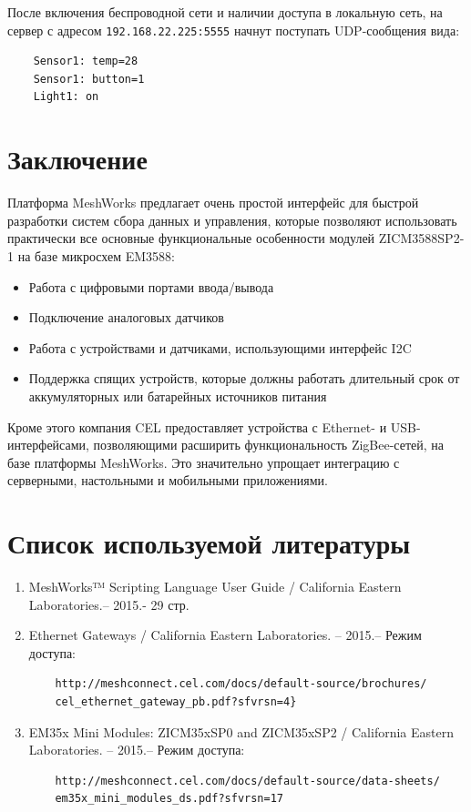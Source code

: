 \documentclass[11pt]{article}
\begin{document}
После включения беспроводной сети и наличии доступа в локальную сеть, на сервер с адресом
\texttt{192.168.22.225:5555} начнут поступать UDP-сообщения вида:
\begin{verbatim}
    Sensor1: temp=28
    Sensor1: button=1
    Light1: on
\end{verbatim}

\section*{Заключение}
Платформа MeshWorks предлагает очень простой интерфейс для быстрой разработки систем
сбора данных и управления, которые позволяют использовать практически все основные функциональные
особенности модулей ZICM3588SP2-1 на базе микросхем EM3588:
\begin{itemize}
 \item Работа с цифровыми портами ввода/вывода
 \item Подключение аналоговых датчиков
 \item Работа с устройствами и датчиками, использующими интерфейс I2C
 \item Поддержка спящих устройств, которые должны работать длительный срок от
 аккумуляторных или батарейных источников питания
\end{itemize}
Кроме этого компания CEL предоставляет устройства с Ethernet- и USB-интерфейсами, 
позволяющими расширить функциональность ZigBee-сетей, на базе платформы MeshWorks.
Это значительно упрощает интеграцию с серверными, настольными и мобильными приложениями.
\newpage %
\section*{Список используемой литературы}

\begin{enumerate}
    \item MeshWorks™ Scripting Language User Guide / California Eastern Laboratories.--
    2015.- 29 стр.
    \item Ethernet Gateways / California Eastern Laboratories. -- 2015.– Режим доступа:
    \begin{verbatim}
    http://meshconnect.cel.com/docs/default-source/brochures/
    cel_ethernet_gateway_pb.pdf?sfvrsn=4}
    \end{verbatim}
    \item EM35x Mini Modules: ZICM35xSP0 and ZICM35xSP2 / California Eastern Laboratories. -- 2015.– Режим доступа:
    \begin{verbatim}
    http://meshconnect.cel.com/docs/default-source/data-sheets/
    em35x_mini_modules_ds.pdf?sfvrsn=17
    \end{verbatim}
\end{enumerate}
\end{document}
